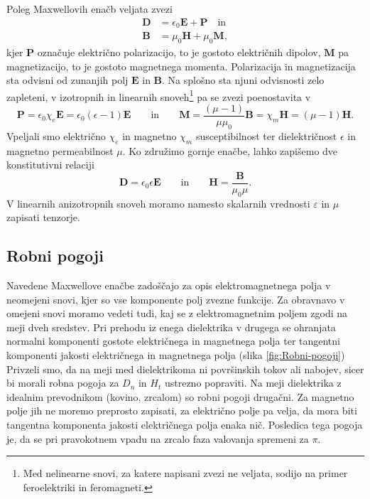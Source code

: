 Poleg Maxwellovih enačb veljata zvezi
\begin{align}
\mathbf{D} & =\epsilon_{0}\mathbf{E}+\mathbf{P} \quad \mathrm{in}\\
\mathbf{B} & =\mu_{0}\mathbf{H}+\mu_{0}\mathbf{M},
\end{align}
kjer $\mathbf{P}$ označuje električno
polarizacijo, to je gostoto električnih dipolov, $\mathbf{M}$
pa magnetizacijo, to je gostoto magnetnega momenta.
Polarizacija in magnetizacija sta odvisni od zunanjih polj $\mathbf{E}$
in $\mathbf{B}$. Na splošno sta njuni odvisnosti zelo zapleteni,
v izotropnih in linearnih snoveh\footnote{Med nelinearne snovi, za katere
napisani zvezi ne veljata, sodijo na primer feroelektriki in feromagneti.}
pa se zvezi poenostavita v 
\begin{equation}
\mathbf{P}=\epsilon_{0}\chi_e\mathbf{E} = \epsilon_{0}(\epsilon-1)\mathbf{E} \qquad \textrm{in} 
\qquad
\mathbf{M}=\frac{(\mu-1)}{\mu\mu_0}\mathbf{B} = \chi_m \mathbf{H} = (\mu-1)\mathbf{H}
\label{eq:PM}.
\end{equation}
Vpeljali smo  električno $\chi_e$ in 
magnetno $\chi_m$ susceptibilnost ter
dielektričnost $\epsilon$ in
magnetno permeabilnost $\mu$. Ko združimo gornje
enačbe, lahko zapišemo dve konstitutivni
relaciji
\begin{equation}
\mathbf{D}  =\epsilon_{0}\epsilon\mathbf{E}\qquad \textrm{in} 
\qquad
\mathbf{H}  =\frac{\mathbf{B}}{\mu_{0}\mu}.
\end{equation}
V linearnih anizotropnih snoveh moramo namesto skalarnih vrednosti $\varepsilon$
in $\mu$ zapisati tenzorje. 

\subsection*{Robni pogoji}
Navedene Maxwellove enačbe zadoščajo za opis elektromagnetnega polja
v neomejeni snovi, kjer so vse komponente polj zvezne funkcije. Za
obravnavo v omejeni snovi moramo vedeti tudi, kaj se z elektromagnetnim
poljem zgodi na meji dveh sredstev. Pri prehodu
iz enega dielektrika v drugega se ohranjata normalni komponenti gostote
električnega in magnetnega polja ter tangentni komponenti jakosti
električnega in magnetnega polja (slika \ref{fig:Robni-pogoji}) 
Privzeli smo, da na meji med dielektrikoma ni površinskih
tokov ali nabojev, sicer bi morali robna pogoja za $D_n$ in $H_t$
ustrezno popraviti. Na meji dielektrika z idealnim prevodnikom (kovino,
zrcalom) so robni pogoji drugačni. Za magnetno polje jih ne moremo
preprosto zapisati, za električno polje pa velja, da mora biti tangentna
komponenta jakosti električnega polja enaka nič. Posledica tega 
pogoja je, da se pri pravokotnem vpadu na zrcalo faza valovanja
spremeni za $\pi$. 

